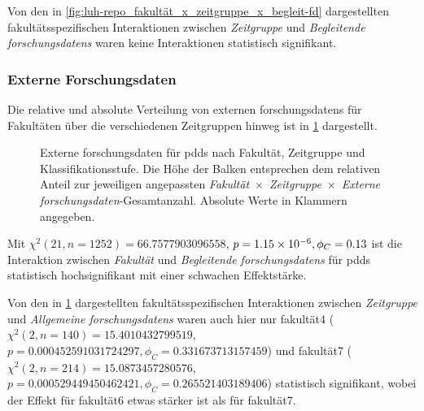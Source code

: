 Von den in \cref{fig:luh-repo_fakultät_x_zeitgruppe_x_begleit-fd} dargestellten fakultätsspezifischen Interaktionen zwischen \textit{Zeitgruppe} und \textit{Begleitende \glspl{forschungsdaten}} waren keine Interaktionen statistisch signifikant.\pagebreak

\subsubsection{Externe Forschungsdaten}
Die relative und absolute Verteilung von externen \glspl{forschungsdaten} für Fakultäten über die verschiedenen Zeitgruppen hinweg ist in \cref{fig:luh-repo_fakultät_x_zeitgruppe_x_externe-fd} dargestellt.
\begin{figure}[!htbp]
    \resizebox{\ifdim\width>\textwidth\textwidth\else\width\fi}{!}{}
    \caption{Externe \gls{forschungsdaten} für \glspl{pdd} nach Fakultät, Zeitgruppe und Klassifikationsstufe.
    Die Höhe der Balken entsprechen dem relativen Anteil zur jeweiligen angepassten \textit{Fakultät}~$\times$~\textit{Zeitgruppe}~$\times$~\textit{Externe \gls{forschungsdaten}}-Gesamtanzahl.
    Absolute Werte in Klammern angegeben.}
    \label{fig:luh-repo_fakultät_x_zeitgruppe_x_externe-fd}
\end{figure}
Mit $\chi^2 (\num{21}, n=\num{1252}) = \num[round-mode=places,round-precision=2]{66.7577903096558}$, $p = \num[round-mode=places,round-precision=2]{1.1517458402742E-06},\phi_C=\num[round-mode=places,round-precision=2]{0.133317814235608}$ ist die Interaktion zwischen \textit{Fakultät} und \textit{Begleitende \glspl{forschungsdaten}} für \glspl{pdd} statistisch hochsignifikant mit einer schwachen Effektstärke.

Von den in \cref{fig:luh-repo_fakultät_x_zeitgruppe_x_externe-fd} dargestellten fakultätsspezifischen Interaktionen zwischen \textit{Zeitgruppe} und \textit{Allgemeine \glspl{forschungsdaten}} waren auch hier nur \gls{fakultät4} ($\chi^2 (\num{2}, n=\num{140}) = \num[round-mode=places,round-precision=2]{15.4010432799519}$, $p = \num[round-mode=places,round-precision=4]{0.000452591031724297},\phi_C=\num[round-mode=places,round-precision=2]{0.331673713157459}$) und \gls{fakultät7} ($\chi^2 (\num{2}, n=\num{214}) = \num[round-mode=places,round-precision=2]{15.0873457280576}$, $p = \num[round-mode=places,round-precision=3]{0.000529449450462421},\phi_C=\num[round-mode=places,round-precision=2]{0.265521403189406}$) statistisch signifikant, wobei der Effekt für \gls{fakultät6} etwas stärker ist als für \gls{fakultät7}.

